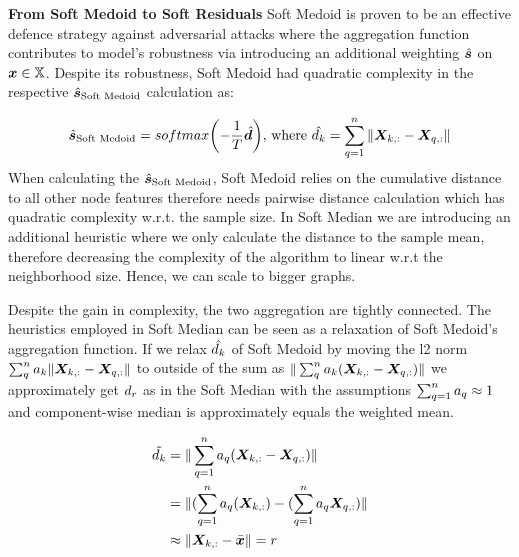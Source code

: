 \documentclass{article} %
\newcommand{\features}{\mX}
\newcommand{\featset}{\sX}
\newcommand{\softout}{\vs}
\begin{document}
\textbf{From Soft Medoid to Soft Residuals}
  Soft Medoid is proven to be an effective defence strategy against adversarial attacks where the aggregation function contributes to model's robustness via introducing an additional weighting $\hat{\softout}$ on $\vx \in \featset$. Despite its robustness, Soft Medoid had quadratic complexity in the respective $\hat{\softout}_{\text{Soft Medoid}}$ calculation as:

\begin{equation}\label{eq:softoutsoftmedoid}
    \hat{\softout}_{\text{Soft Medoid}}
    = softmax{\left(-\frac{1}{T} \hat{\vd} \right )}\text{,~where}~\hat{\evd_{k}} = \sum_{q=1}^n \|\features_{k,:} - \features_{q,:}\| 
\end{equation}
When calculating the $\hat{\softout}_{\text{Soft Medoid}}$, Soft Medoid relies on the cumulative distance to all other node features therefore needs pairwise distance calculation which has quadratic complexity w.r.t. the sample size. In Soft Median we are introducing an additional heuristic where we only calculate the distance to the sample mean, therefore decreasing the complexity of the algorithm to linear w.r.t the neighborhood size. Hence, we can scale to bigger graphs.

Despite the gain in complexity, the two aggregation are tightly connected. The heuristics employed in Soft Median can be seen as a relaxation of Soft Medoid's aggregation function. If we relax $\hat{{d}_k}$ of Soft Medoid by moving the l2 norm $\sum_{q}^n \eva_k\|\features_{k,:} - \features_{q,:}\|$ to outside of the sum as $\|\sum_{q}^n \eva_k(\features_{k,:} - \features_{q,:})\|$ we approximately get ${d}_r$ as in the Soft Median with the assumptions $\sum_{q=1}^n{a}_q \approx 1$ and component-wise median is approximately equals the weighted mean.

\begin{equation}\label{eq:distrelaxsoftmedoid}
    \begin{aligned}
    \tilde{\evd_k}  &= \|\sum_{q=1}^n \eva_q(\features_{k,:} - \features_{q,:})\| \\
    &= \|(\sum_{q=1}^n \eva_q(\features_{k,:}) - (\sum_{q=1}^n \eva_q\features_{q,:})\| \\
    &\approx \|\features_{k,:} - \bar{\vx}\| = \evr
    \end{aligned}
\end{equation}

\end{document}
